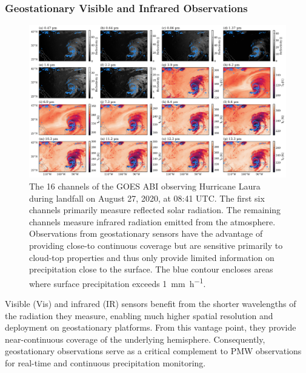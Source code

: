 \documentclass[11pt]{article}
\begin{document}
\subsubsection{Geostationary Visible and Infrared Observations}

\begin{figure}[htbp] %
	\centering
	\includegraphics[width=1.0\textwidth]{figures/fig03}
	\caption{
		The 16 channels of the GOES ABI observing Hurricane Laura during
		landfall on August 27, 2020, at 08:41 UTC. The first six channels
		primarily measure reflected solar radiation. The remaining channels
		measure infrared radiation emitted from the atmosphere. Observations
		from geostationary sensors have the advantage of providing close-to
		continuous coverage but are sensitive primarily to cloud-top properties
		and thus only provide limited information on precipitation close to the
		surface. The blue contour encloses areas where surface precipitation
		exceeds \SI{1}{\milli \meter \per \hour}.
	}
	\label{fig:observations_geo}
\end{figure}

Visible (Vis) and infrared (IR) sensors benefit from the shorter wavelengths of
the radiation they measure, enabling much higher spatial resolution and
deployment on geostationary platforms. From this vantage point, they provide
near-continuous coverage of the underlying hemisphere. Consequently,
geostationary observations serve as a critical complement to PMW observations
for real-time and continuous precipitation monitoring.
\end{document}
